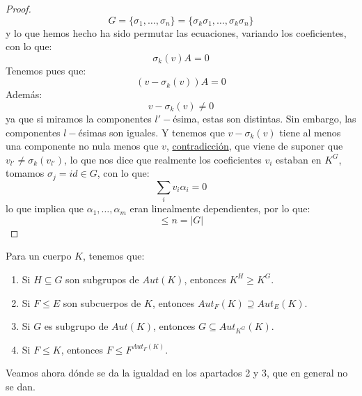 \begin{prop}[Artin]
\begin{proof}
\begin{equation*}
            G = \{\sigma_1, \ldots, \sigma_n\} = \{\sigma_k\sigma_1, \ldots, \sigma_k\sigma_n\}
        \end{equation*}
        y lo que hemos hecho ha sido permutar las ecuaciones, variando los coeficientes, con lo que:
        \begin{equation*}
            \sigma_k(v)A = 0
        \end{equation*}
        Tenemos pues que:
        \begin{equation*}
            (v-\sigma_k(v))A = 0
        \end{equation*}
        Además:
        \begin{equation*}
            v-\sigma_k(v) \neq 0
        \end{equation*}
        ya que si miramos la componentes $l'-$ésima, estas son distintas. Sin embargo, las componentes $l-$ésimas son iguales. Y tenemos que $v-\sigma_k(v)$ tiene al menos una componente no nula menos que $v$, \underline{contradicción}, que viene de suponer que $v_{l'}\neq \sigma_k(v_{l'})$, lo que nos dice que realmente los coeficientes $v_i$ estaban en $K^G$, tomamos $\sigma_j = id\in G$, con lo que:
        \begin{equation*}
            \sum_{i}v_i \alpha_i = 0
        \end{equation*}
        lo que implica que $\alpha_1, \ldots, \alpha_m$ eran linealmente dependientes, por lo que:
        \begin{equation*}
            [K:K^G] \leq n = |G|
        \end{equation*}
    \end{proof}
\end{prop}

\begin{lema} %
    Para un cuerpo $K$, tenemos que:
    \begin{enumerate}
        \item Si $H\subseteq G$ son subgrupos de $Aut(K)$, entonces $K^H \geq K^G$. %
        \item Si $F\leq E$ son subcuerpos de $K$, entonces $Aut_F(K)\supseteq Aut_E(K)$.
        \item Si $G$ es subgrupo de $Aut(K)$, entonces $G\subseteq Aut_{K^G}(K)$.
        \item Si $F\leq K$, entonces $F\leq F^{Aut_F(K)}$.
    \end{enumerate}
\end{lema}
Veamos ahora dónde se da la igualdad en los apartados 2 y 3, que en general no se dan.

